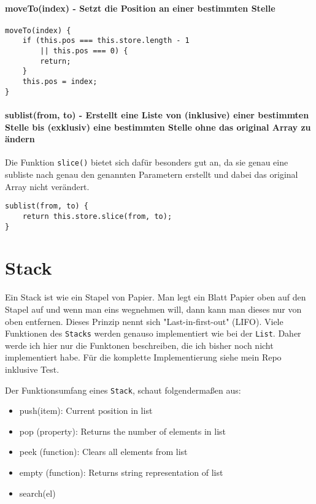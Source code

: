 \documentclass{book}
\begin{document}
\paragraph{moveTo(index) - Setzt die Position an einer bestimmten Stelle}
\begin{lstlisting}[caption=Array Konstruktor]
moveTo(index) {
	if (this.pos === this.store.length - 1 
		|| this.pos === 0) {
		return;
	}
	this.pos = index;
}
\end{lstlisting}
\paragraph{sublist(from, to) - Erstellt eine Liste von (inklusive) einer bestimmten Stelle bis (exklusiv) eine bestimmten Stelle ohne das original Array zu ändern} Die Funktion \lstinline|slice()| bietet sich dafür besonders gut an, da sie genau eine subliste nach genau den genannten Parametern erstellt und dabei das original Array nicht verändert.
\begin{lstlisting}[caption=Array Konstruktor]
sublist(from, to) {
	return this.store.slice(from, to);
}

\end{lstlisting}
\section{Stack}
Ein Stack ist wie ein Stapel von Papier. Man legt ein Blatt Papier oben auf den Stapel auf und wenn man eins wegnehmen will, dann kann man dieses nur von oben entfernen. Dieses Prinzip nennt sich "Last-in-first-out" (LIFO). Viele Funktionen des \lstinline|Stacks| werden genauso implementiert wie bei der \lstinline|List|. Daher werde ich hier nur die Funktonen beschreiben, die ich bisher noch nicht implementiert habe. Für die komplette Implementierung siehe mein Repo inklusive Test.

Der Funktionsumfang eines \lstinline|Stack|, schaut folgendermaßen aus:

\begin{itemize} 
	\item push(item): Current position in list
	\item pop (property): Returns the number of elements in list	
	\item peek (function): Clears all elements from list
	\item empty (function): Returns string representation of list
	\item search(el)
\end{itemize}
\end{document}
